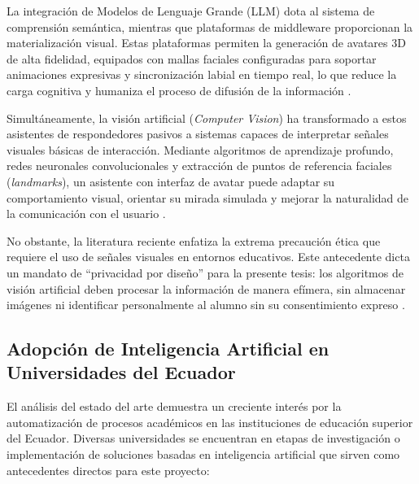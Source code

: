 La integración de Modelos de Lenguaje Grande (LLM) dota al sistema de comprensión semántica, mientras que plataformas de middleware proporcionan la materialización visual. Estas plataformas permiten la generación de avatares 3D de alta fidelidad, equipados con mallas faciales configuradas para soportar animaciones expresivas y sincronización labial en tiempo real, lo que reduce la carga cognitiva y humaniza el proceso de difusión de la información \cite{pabon2025naia}.

Simultáneamente, la visión artificial (\textit{Computer Vision}) ha transformado a estos asistentes de respondedores pasivos a sistemas capaces de interpretar señales visuales básicas de interacción. Mediante algoritmos de aprendizaje profundo, redes neuronales convolucionales y extracción de puntos de referencia faciales (\textit{landmarks}), un asistente con interfaz de avatar puede adaptar su comportamiento visual, orientar su mirada simulada y mejorar la naturalidad de la comunicación con el usuario \cite{lightweightgaze2024}.

No obstante, la literatura reciente enfatiza la extrema precaución ética que requiere el uso de señales visuales en entornos educativos. Este antecedente dicta un mandato de ``privacidad por diseño'' para la presente tesis: los algoritmos de visión artificial deben procesar la información de manera efímera, sin almacenar imágenes ni identificar personalmente al alumno sin su consentimiento expreso \cite{abedi2024engagement}.

\subsection{Adopción de Inteligencia Artificial en Universidades del Ecuador}
El análisis del estado del arte demuestra un creciente interés por la automatización de procesos académicos en las instituciones de educación superior del Ecuador. Diversas universidades se encuentran en etapas de investigación o implementación de soluciones basadas en inteligencia artificial que sirven como antecedentes directos para este proyecto:

